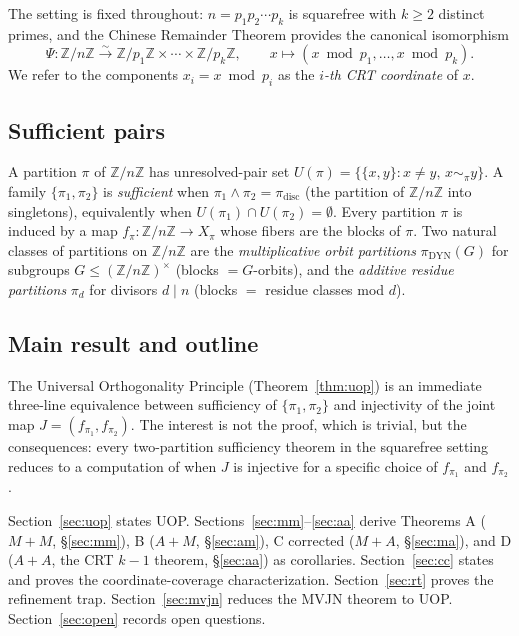 \documentclass[11pt,reqno]{amsart}
\theoremstyle{plain}
\theoremstyle{definition}
\newcommand{\Z}{\mathbb{Z}}
\newcommand{\Zn}{\Z/n\Z}
\newcommand{\Zns}{(\Z/n\Z)^{\times}}
\newcommand{\meet}{\wedge}
\newcommand{\disc}{\mathrm{disc}}
\newcommand{\DYN}{\mathrm{DYN}}
\begin{document}
The setting is fixed throughout: $n = p_1 p_2 \cdots p_k$ is squarefree with $k \geq 2$ distinct primes, and the Chinese Remainder Theorem provides the canonical isomorphism
\[
\Psi \colon \Zn \xrightarrow{\sim} \Z/p_1\Z \times \cdots \times \Z/p_k\Z, \qquad x \mapsto (x \bmod p_1, \ldots, x \bmod p_k).
\]
We refer to the components $x_i = x \bmod p_i$ as the \emph{$i$-th CRT coordinate} of $x$.

\subsection{Sufficient pairs}

A partition $\pi$ of $\Zn$ has unresolved-pair set $U(\pi) = \{\{x,y\} : x \neq y, \, x \sim_{\pi} y\}$. A family $\{\pi_1,\pi_2\}$ is \emph{sufficient} when $\pi_1 \meet \pi_2 = \pi_{\disc}$ (the partition of $\Zn$ into singletons), equivalently when $U(\pi_1) \cap U(\pi_2) = \emptyset$. Every partition $\pi$ is induced by a map $f_{\pi} \colon \Zn \to X_{\pi}$ whose fibers are the blocks of $\pi$. Two natural classes of partitions on $\Zn$ are the \emph{multiplicative orbit partitions} $\pi_{\DYN}(G)$ for subgroups $G \leq \Zns$ (blocks $= G$-orbits), and the \emph{additive residue partitions} $\pi_d$ for divisors $d \mid n$ (blocks $= $ residue classes mod $d$).

\subsection{Main result and outline}

The Universal Orthogonality Principle (Theorem~\ref{thm:uop}) is an immediate three-line equivalence between sufficiency of $\{\pi_1,\pi_2\}$ and injectivity of the joint map $J = (f_{\pi_1}, f_{\pi_2})$. The interest is not the proof, which is trivial, but the consequences: every two-partition sufficiency theorem in the squarefree setting reduces to a computation of when $J$ is injective for a specific choice of $f_{\pi_1}$ and $f_{\pi_2}$.

Section~\ref{sec:uop} states UOP. Sections~\ref{sec:mm}--\ref{sec:aa} derive Theorems A ($M{+}M$, \S\ref{sec:mm}), B ($A{+}M$, \S\ref{sec:am}), C corrected ($M{+}A$, \S\ref{sec:ma}), and D ($A{+}A$, the CRT $k-1$ theorem, \S\ref{sec:aa}) as corollaries. Section~\ref{sec:cc} states and proves the coordinate-coverage characterization. Section~\ref{sec:rt} proves the refinement trap. Section~\ref{sec:mvjn} reduces the MVJN theorem to UOP. Section~\ref{sec:open} records open questions.
\end{document}

